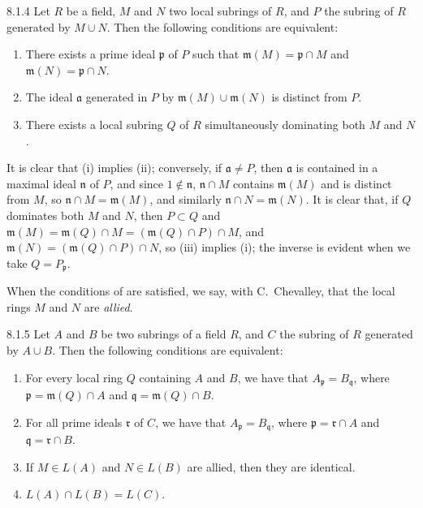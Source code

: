 \begin{envs}[Lemma]{8.1.4}
\label{lem-1.8.1.4}
Let $R$ be a field, $M$ and $N$ two local
subrings of $R$, and $P$ the subring of $R$ generated by $M\cup N$. Then the
following conditions are equivalent:
\begin{enumerate}[label=\rm{(\roman*)}]
  \item There exists a prime ideal $\mathfrak{p}$ of $P$ such that
        $\mathfrak{m}(M)=\mathfrak{p}\cap M$ and $\mathfrak{m}(N)=\mathfrak{p}\cap N$.
  \item The ideal $\mathfrak{a}$ generated in $P$ by $\mathfrak{m}(M)\cup\mathfrak{m}(N)$ is
        distinct from $P$.
  \item There exists a local subring $Q$ of $R$ simultaneously dominating both $M$ and $N$.
\end{enumerate}
\end{envs}

It is clear that (i) implies (ii); conversely, if $\mathfrak{a}\neq P$, then
$\mathfrak{a}$ is contained in a maximal ideal $\mathfrak{n}$ of $P$, and since
$1\not\in\mathfrak{n}$, $\mathfrak{n}\cap M$ contains $\mathfrak{m}(M)$ and is
distinct from $M$, so $\mathfrak{n}\cap M=\mathfrak{m}(M)$, and similarly
$\mathfrak{n}\cap N=\mathfrak{m}(N)$. It is clear that, if $Q$ dominates both
$M$ and $N$, then $P\subset Q$ and
$\mathfrak{m}(M)=\mathfrak{m}(Q)\cap M=(\mathfrak{m}(Q)\cap P)\cap M$, and
$\mathfrak{m}(N)=(\mathfrak{m}(Q)\cap P)\cap N$, so (iii) implies (i); the inverse is evident
when we take $Q=P_\mathfrak{p}$.

When the conditions of  are satisfied, we say, with C.~Chevalley,
that the local rings $M$ and $N$ are \emph{allied}.

\begin{envs}[Proposition]{8.1.5}
\label{prop-1.8.1.5}
Let $A$ and $B$ be two subrings of a field $R$,
and $C$ the subring of $R$ generated by $A\cup B$. Then the following
conditions are equivalent:
\begin{enumerate}[label=\rm{(\roman*)}]
  \item For every local ring $Q$ containing $A$ and $B$, we have that
        $A_\mathfrak{p}=B_\mathfrak{q}$, where $\mathfrak{p}=\mathfrak{m}(Q)\cap A$ and
        $\mathfrak{q}=\mathfrak{m}(Q)\cap B$.
  \item For all prime ideals $\mathfrak{r}$ of $C$, we have that
        $A_\mathfrak{p}=B_\mathfrak{q}$, where $\mathfrak{p}=\mathfrak{r}\cap A$ and
        $\mathfrak{q}=\mathfrak{r}\cap B$.
  \item If $M\in L(A)$ and $N\in L(B)$ are allied, then they are identical.
  \item $L(A)\cap L(B)=L(C)$.
\end{enumerate}
\end{envs}


